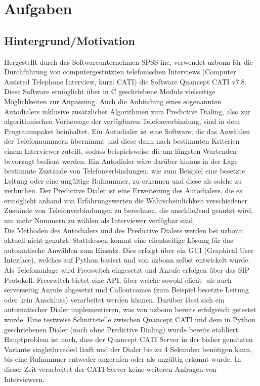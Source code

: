\section{Aufgaben}\label{sec:aufgaben}

\subsection{Hintergrund/Motivation }

Hergestellt durch das Softwareunternehmen SPSS inc, verwendet uzbonn für die Durchführung von computergestützten telefonischen Interviews (Computer Assisted Telephone Interview, kurz: CATI) die Software Quancept CATI v7.8. Diese Software ermöglicht über in C geschriebene Module vielseitige Möglichkeiten zur Anpassung. Auch die Anbindung eines sogenannten Autodialers inklusive zusätzlicher Algorithmen zum Predictive Dialing, also zur algorithmischen Vorhersage der verfügbaren Telefonverbindung, sind in dem Programmpaket beinhaltet. Ein Autodialer ist eine Software, die das Anwählen der Telefonnummern übernimmt und diese dann nach bestimmten Kriterien einem Interviewer zuteilt, sodass beispielsweise die am längsten Wartenden bevorzugt bedient werden. Ein Autodialer wäre darüber hinaus in der Lage bestimmte Zustände von Telefonverbindungen, wie zum Beispiel eine besetzte Leitung oder eine ungültige Rufnummer, zu erkennen und diese als solche zu verbuchen. Der Predictive Dialer ist eine Erweiterung des Autodialers, die es ermöglicht anhand von Erfahrungswerten die Wahrscheinlichkeit verschiedener Zustände von Telefonverbindungen zu berechnen, die anschließend genutzt wird, um mehr Nummern zu wählen als Interviewer verfügbar sind. \\

Die Methoden des Autodialers und des Predictive Dialers werden bei uzbonn aktuell nicht genutzt. Stattdessen kommt eine clientseitige Lösung für das automatische Anwählen zum Einsatz. Dies erfolgt über ein GUI (Graphical User Interface), welches auf Python basiert und von uzbonn selbst entwickelt wurde. Als Telefonanlage wird Freeswitch eingesetzt und Anrufe erfolgen über das SIP Protokoll. Freeswitch bietet eine API, über welche sowohl client- als auch serverseitig Anrufe abgesetzt und Calloutcomes (zum Beispiel besetzte Leitung oder kein Anschluss) verarbeitet werden können. Darüber lässt sich ein automatischer Dialer implementieren, was von uzbonn bereits erfolgreich getestet wurde. Eine testweise Schnittstelle zwischen Quancept CATI und dem in Python geschriebenen Dialer (noch ohne Predictive Dialing) wurde bereits etabliert. Hauptproblem ist noch, dass der Quancept CATI Server in der bisher genutzten Variante singlethreaded läuft und der Dialer bis zu 4 Sekunden benötigen kann, bis eine Rufnummer entweder angerufen oder als ungültig erkannt wurde. In dieser Zeit verarbeitet der CATI-Server keine weiteren Anfragen von Interviewern. 


